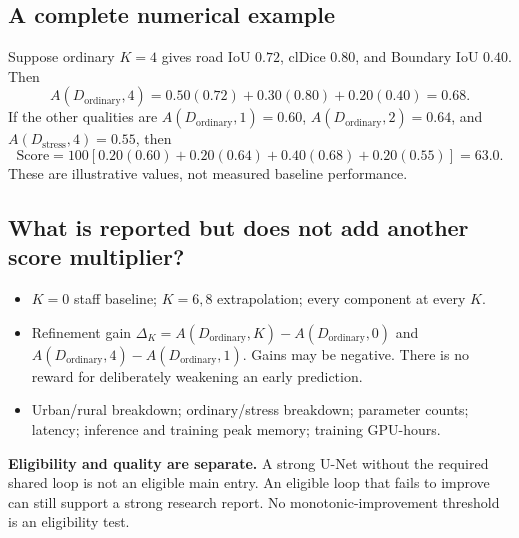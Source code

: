 \documentclass[11pt,letterpaper]{article}
\newcommand{\Oset}{D_{\mathrm{ordinary}}}
\newcommand{\Tset}{D_{\mathrm{stress}}}
\begin{document}
\begin{center}
\end{center}

\subsection{A complete numerical example}
Suppose ordinary $K=4$ gives road IoU $0.72$, clDice $0.80$, and Boundary IoU $0.40$. Then
\[
 A(\Oset,4)=0.50(0.72)+0.30(0.80)+0.20(0.40)=0.68.
\]
If the other qualities are $A(\Oset,1)=0.60$, $A(\Oset,2)=0.64$, and $A(\Tset,4)=0.55$, then
\[
 \mathrm{Score}=100[0.20(0.60)+0.20(0.64)+0.40(0.68)+0.20(0.55)]=63.0.
\]
These are illustrative values, not measured baseline performance.

\subsection{What is reported but does not add another score multiplier?}
\begin{itemize}
\item $K=0$ staff baseline; $K=6,8$ extrapolation; every component at every $K$.
\item Refinement gain $\Delta_K=A(\Oset,K)-A(\Oset,0)$ and $A(\Oset,4)-A(\Oset,1)$. Gains may be negative. There is no reward for deliberately weakening an early prediction.
\item Urban/rural breakdown; ordinary/stress breakdown; parameter counts; latency; inference and training peak memory; training GPU-hours.
\end{itemize}
\textbf{Eligibility and quality are separate.} A strong U-Net without the required shared loop is not an eligible main entry. An eligible loop that fails to improve can still support a strong research report. No monotonic-improvement threshold is an eligibility test.
\end{document}
